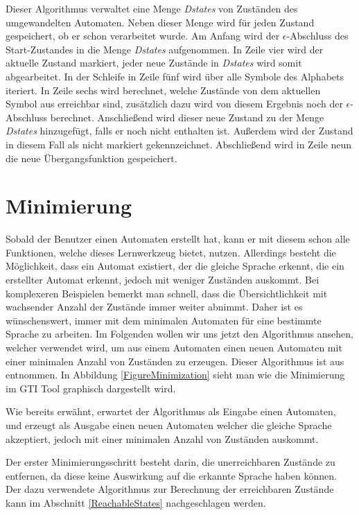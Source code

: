 Dieser Algorithmus verwaltet eine Menge \textit{Dstates} von Zuständen des
umgewandelten Automaten. Neben dieser Menge wird für jeden Zustand gespeichert,
ob er schon verarbeitet wurde. Am Anfang wird der $\epsilon$-Abschluss des
Start-Zustandes  in die Menge \textit{Dstates} aufgenommen. In Zeile
vier wird der aktuelle Zustand markiert, jeder neue Zustände in \textit{Dstates}
wird somit abgearbeitet. In der Schleife in Zeile fünf wird über alle Symbole des
Alphabets iteriert. In Zeile sechs wird berechnet, welche Zustände von dem
aktuellen Symbol aus erreichbar sind, zusätzlich dazu wird von diesem Ergebnis
noch der $\epsilon$-Abschluss berechnet. Anschließend wird dieser neue Zustand zu
der Menge \textit{Dstates} hinzugefügt, falls er noch nicht enthalten ist.
Außerdem wird der Zustand in diesem Fall als nicht markiert gekennzeichnet.
Abschließend wird in Zeile neun die neue Übergangsfunktion
gespeichert.\vspace{10pt}


\section{Minimierung}\label{Minimize}

Sobald der Benutzer einen Automaten erstellt hat, kann er mit diesem schon alle
Funktionen, welche dieses Lernwerkzeug bietet, nutzen. Allerdings besteht die
Möglichkeit, dass ein Automat existiert, der die gleiche Sprache erkennt, die ein
erstellter Automat erkennt, jedoch mit weniger Zuständen auskommt. Bei
komplexeren Beispielen bemerkt man schnell, dass die Übersichtlichkeit mit
wachsender Anzahl der Zustände immer weiter abnimmt. Daher ist es wünschenswert,
immer mit dem minimalen Automaten für eine bestimmte Sprache zu arbeiten. Im
Folgenden wollen wir uns jetzt den Algorithmus ansehen, welcher verwendet wird,
um aus einem Automaten einen neuen Automaten mit einer minimalen Anzahl von
Zuständen zu erzeugen. Dieser Algorithmus ist aus \cite{Compilers}
entnommen. In Abbildung \ref{FigureMinimization} sieht man wie die
Minimierung im GTI Tool graphisch dargestellt wird.\vspace{10pt}

Wie bereits erwähnt, erwartet der Algorithmus als Eingabe einen Automaten, und
erzeugt als Ausgabe einen neuen Automaten welcher die gleiche Sprache
akzeptiert, jedoch mit einer minimalen Anzahl von Zuständen
auskommt.\vspace{10pt}

Der erster Minimierungsschritt besteht darin, die unerreichbaren Zustände zu
entfernen, da diese keine Auswirkung auf die erkannte Sprache haben können. Der
dazu verwendete Algorithmus zur Berechnung der erreichbaren Zustände kann im
Abschnitt \ref{ReachableStates} nachgeschlagen werden.\vspace{10pt}


